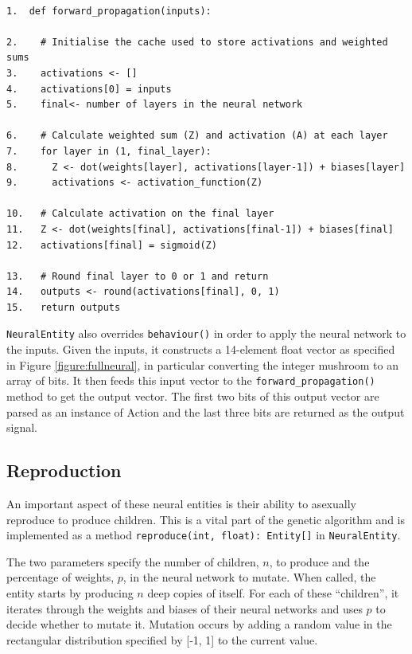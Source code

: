 \documentclass[12pt,a4paper,twoside,openright]{report}
\begin{document}
\begin{verbatim}

1.  def forward_propagation(inputs):

2.    # Initialise the cache used to store activations and weighted sums
3.    activations <- []
4.    activations[0] = inputs
5.    final<- number of layers in the neural network

6.    # Calculate weighted sum (Z) and activation (A) at each layer
7.    for layer in (1, final_layer):
8.      Z <- dot(weights[layer], activations[layer-1]) + biases[layer]
9.      activations <- activation_function(Z)

10.   # Calculate activation on the final layer
11.   Z <- dot(weights[final], activations[final-1]) + biases[final]
12.   activations[final] = sigmoid(Z)

13.   # Round final layer to 0 or 1 and return
14.   outputs <- round(activations[final], 0, 1)
15.   return outputs

\end{verbatim}

\texttt{NeuralEntity} also overrides \texttt{behaviour()} in order to apply the neural network to the inputs. Given the inputs, it constructs a 14-element float vector as specified in Figure \ref{figure:fullneural}, in particular converting the integer mushroom to an array of bits. It then feeds this input vector to the \texttt{forward\_propagation()} method to get the output vector. The first two bits of this output vector are parsed as an instance of Action and the last three bits are returned as the output signal.

\subsection{Reproduction}

An important aspect of these neural entities is their ability to asexually reproduce to produce children. This is a vital part of the genetic algorithm and is implemented as a method \texttt{reproduce(int, float): Entity[]} in \texttt{NeuralEntity}.

The two parameters specify the number of children, $n$, to produce and the percentage of weights, $p$, in the neural network to mutate. When called, the entity starts by producing $n$ deep copies of itself. For each of these ``children'', it iterates through the weights and biases of their neural networks and uses $p$ to decide whether to mutate it. Mutation occurs by adding a random value in the rectangular distribution specified by [-1, 1] to the current value.
\end{document}
